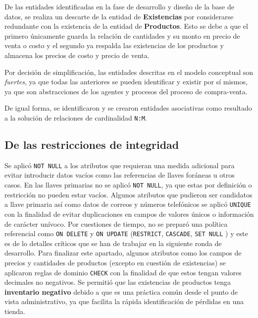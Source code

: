 \documentclass[11pt]{article}
\begin{document}
De las entidades identificadas en la fase de desarrollo y diseño de la base de datos, se realiza un descarte de la entidad de \textbf{Existencias} por considerarse redundante con la existencia de la entidad de \textbf{Productos}. Esto se debe a que el primero únicamente guarda la relación de cantidades y su monto en precio de venta o costo y el segundo ya respalda las existencias de los productos y almacena los precios de costo y precio de venta.
\newline

Por decisión de simplificación, las entidades descritas en el modelo conceptual son \textit{fuertes}, ya que todas las anteriores se pueden identificar y existir por sí mismos, ya que son abstracciones de los agentes y procesos del proceso de compra-venta.
\newline

De igual forma, se identificaron y se crearon entidades asociativas como resultado a la solución de relaciones de cardinalidad \texttt{N:M}.

\subsection*{\centering De las restricciones de integridad}

Se aplicó \texttt{NOT NULL} a los atributos que requieran una medida adicional para evitar introducir datos vacíos como las referencias de llaves foráneas u otros casos. En las llaves primarias no se aplicó \texttt{NOT NULL}, ya que estas por definición o restricción no pueden estar vacíos. Algunos atributos que pudieron ser candidatos a llave primaria así como datos de correos y números telefónicos se aplicó \texttt{UNIQUE} con la finalidad de evitar duplicaciones en campos de valores únicos o información de carácter unívoco. Por cuestiones de tiempo, no se preparó una política referencial como \texttt{ON DELETE} y \texttt{ON UPDATE} (\texttt{RESTRICT}, \texttt{CASCADE}, \texttt{SET NULL} ) y este es de lo detalles críticos que se han de trabajar en la siguiente ronda de desarrollo. Para finalizar este apartado, algunos atributos como los campos de precios y cantidades de productos (excepto en cuestión de existencias) se aplicaron reglas de dominio \texttt{CHECK} con la finalidad de que estos tengan valores decimales no negativos. Se permitió que las existencias de productos tenga \textbf{inventario negativo} debido a que es una práctica común desde el punto de vista administrativo, ya que facilita la rápida identificación de pérdidas en una tienda.
\end{document}
